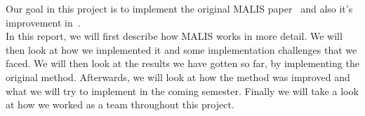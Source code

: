 Our goal in this project is to implement the original MALIS
paper~\cite{turaga_maximin_2009} and also it's improvement
in~\cite{funke_large_2019}.\\

In this report, we will first describe how MALIS works in more detail. We will
then look at how we implemented it and some implementation challenges that we
faced. We will then look at the results we have gotten so far, by implementing
the original method. Afterwards, we will look at how the method was improved
and what we will try to implement in the coming semester. Finally we will take
a look at how we worked as a team throughout this project.

